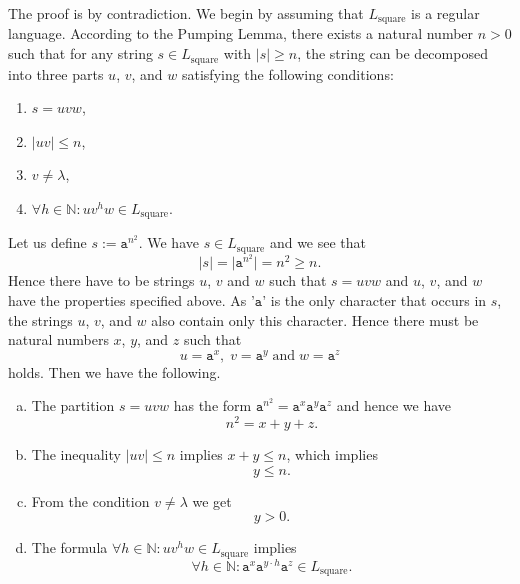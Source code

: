 \solutionEng
The proof is by contradiction. We begin by assuming that $L_{\mathrm{square}}$ is a regular
language. According to the Pumping Lemma, there exists a natural number $n > 0$ such that for any string
$s \in L_{\mathrm{square}}$ with $|s| \geq n$, the string can be decomposed into three parts $u$, $v$, and $w$ 
satisfying the following conditions:  
\begin{enumerate}
\item $s = uvw$,
\item $|uv| \leq n$,
\item $v \not= \lambda$,
\item $\forall h \in \mathbb{N}: uv^hw \in L_{\mathrm{square}}$. 
\end{enumerate} 
Let us define $s := \mathtt{a}^{n^2}$.  We have $s \in L_{\mathrm{square}}$ and we see that
\[ |s| = \big| \mathtt{a}^{n^2} \big| = n^2 \geq n. \]
Hence there have to be strings $u$, $v$ and $w$ such that $s = uvw$ and $u$, $v$, and $w$ have
the properties specified above.
As '$\mathtt{a}$' is the only character that occurs in $s$, the strings $u$, $v$, and $w$ also contain only this character.
Hence there must be natural numbers $x$, $y$, and $z$ such that 
\[ u = \mathtt{a}^x,\; v = \mathtt{a}^y\; \mbox{and}\; w = \mathtt{a}^z \]
holds.  Then we have the following.
\begin{enumerate}[(a)]
\item The partition  $s = uvw$ has the form $\mathtt{a}^{n^2} = \mathtt{a}^x\mathtt{a}^y\mathtt{a}^z$ and hence we have
      \begin{equation}
        \label{eq:e1}
         n^2 = x + y + z.     
      \end{equation}
\item The inequality $|uv| \leq n$ implies $x +y \leq n$, which implies
      \begin{equation}
        \label{eq:e2}
        y \leq n.
      \end{equation}
\item From the condition $v \not= \lambda$ we get
      \begin{equation}
        \label{eq:e3}
        y > 0.
      \end{equation}
\item The formula $\forall h \in \mathbb{N}: uv^hw \in L_{\mathrm{square}}$ implies
      \begin{equation}
        \label{eq:e4}
        \forall h \in \mathbb{N}: \mathtt{a}^x\mathtt{a}^{y\cdot h}\mathtt{a}^z \in L_{\mathrm{square}}. 
      \end{equation}
\end{enumerate}
